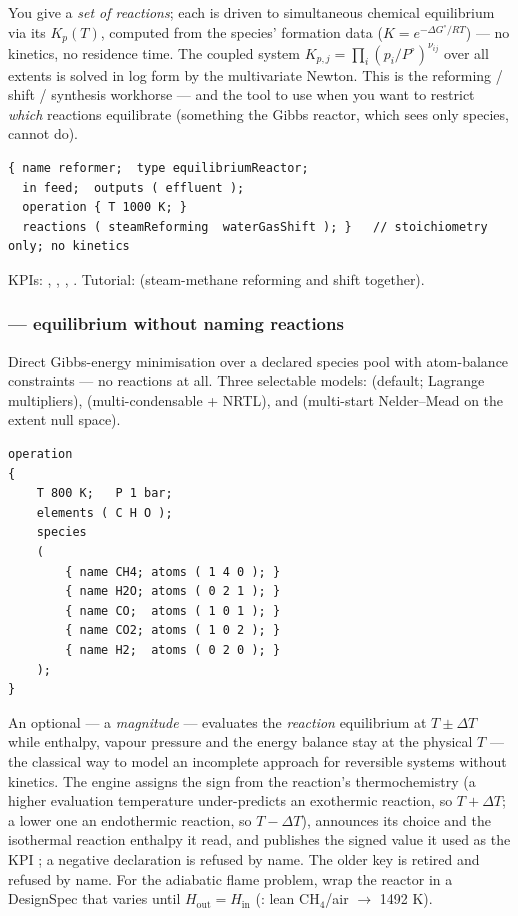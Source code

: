 \documentclass[11pt,a4paper]{article}
\begin{document}
You give a \emph{set of reactions}; each is driven to simultaneous
chemical equilibrium via its $K_p(T)$, computed from the species'
formation data ($K = e^{-\Delta G^\circ/RT}$) --- no kinetics, no
residence time.  The coupled system
$K_{p,j} = \prod_i (p_i/P^\circ)^{\nu_{ij}}$ over all extents is solved
in log form by the multivariate Newton.  This is the reforming / shift
/ synthesis workhorse --- and the tool to use when you want to restrict
\emph{which} reactions equilibrate (something the Gibbs reactor, which
sees only species, cannot do).

\begin{lstlisting}[language=dict]
{ name reformer;  type equilibriumReactor;
  in feed;  outputs ( effluent );
  operation { T 1000 K; }
  reactions ( steamReforming  waterGasShift ); }   // stoichiometry only; no kinetics
\end{lstlisting}

KPIs: , ,
, .  Tutorial:
(steam-methane reforming and shift together).

\subsubsection{ --- equilibrium without naming reactions}

Direct Gibbs-energy minimisation over a declared species pool with
atom-balance constraints --- no reactions at all.  Three selectable
models:  (default; Lagrange multipliers),
 (multi-condensable + NRTL), and 
(multi-start Nelder--Mead on the extent null space).

\begin{lstlisting}[language=dict]
operation
{
    T 800 K;   P 1 bar;
    elements ( C H O );
    species
    (
        { name CH4; atoms ( 1 4 0 ); }
        { name H2O; atoms ( 0 2 1 ); }
        { name CO;  atoms ( 1 0 1 ); }
        { name CO2; atoms ( 1 0 2 ); }
        { name H2;  atoms ( 0 2 0 ); }
    );
}
\end{lstlisting}

An optional  --- a \emph{magnitude} ---
evaluates the \emph{reaction} equilibrium at $T \pm \Delta T$ while
enthalpy, vapour pressure and the energy balance stay at the physical $T$
--- the classical way to model an incomplete approach for reversible
systems without kinetics.  The engine assigns the sign from the reaction's
thermochemistry (a higher evaluation temperature under-predicts an
exothermic reaction, so $T + \Delta T$; a lower one an endothermic
reaction, so $T - \Delta T$), announces its choice and the isothermal
reaction enthalpy it read, and publishes the signed value it used as the
KPI ; a negative declaration is refused by
name.  The older key  is retired and refused by
name.  For the adiabatic flame
problem, wrap the reactor in a DesignSpec that varies  until
$H_{\mathrm{out}} = H_{\mathrm{in}}$
(: lean CH$_4$/air $\to$ 1492 K).
\end{document}
